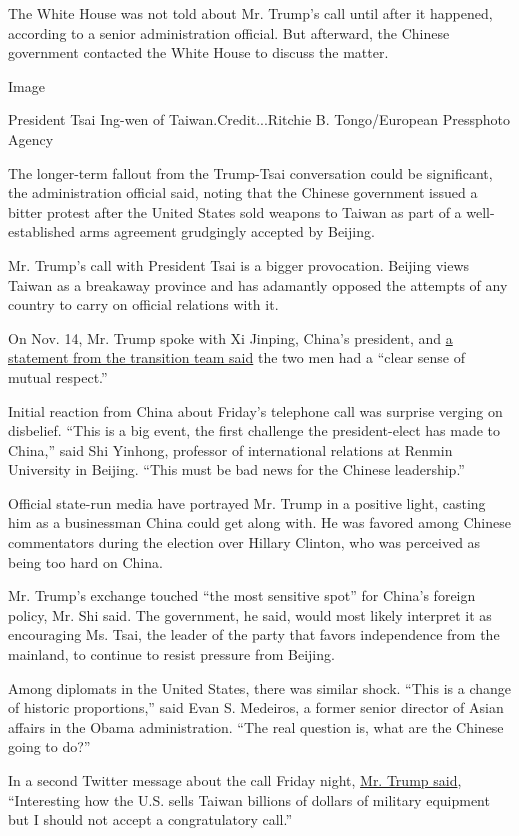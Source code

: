 The White House was not told about Mr. Trump's call until after it
happened, according to a senior administration official. But afterward,
the Chinese government contacted the White House to discuss the matter.

Image

President Tsai Ing-wen of Taiwan.Credit...Ritchie B. Tongo/European
Pressphoto Agency

The longer-term fallout from the Trump-Tsai conversation could be
significant, the administration official said, noting that the Chinese
government issued a bitter protest after the United States sold weapons
to Taiwan as part of a well-established arms agreement grudgingly
accepted by Beijing.

Mr. Trump's call with President Tsai is a bigger provocation. Beijing
views Taiwan as a breakaway province and has adamantly opposed the
attempts of any country to carry on official relations with it.

On Nov. 14, Mr. Trump spoke with Xi Jinping, China's president, and
\href{https://www.nytimes.com/2016/11/14/us/politics/donald-trump-transition.html}{a
statement from the transition team said} the two men had a ``clear sense
of mutual respect.''

Initial reaction from China about Friday's telephone call was surprise
verging on disbelief. ``This is a big event, the first challenge the
president-elect has made to China,'' said Shi Yinhong, professor of
international relations at Renmin University in Beijing. ``This must be
bad news for the Chinese leadership.''

Official state-run media have portrayed Mr. Trump in a positive light,
casting him as a businessman China could get along with. He was favored
among Chinese commentators during the election over Hillary Clinton, who
was perceived as being too hard on China.

Mr. Trump's exchange touched ``the most sensitive spot'' for China's
foreign policy, Mr. Shi said. The government, he said, would most likely
interpret it as encouraging Ms. Tsai, the leader of the party that
favors independence from the mainland, to continue to resist pressure
from Beijing.

Among diplomats in the United States, there was similar shock. ``This is
a change of historic proportions,'' said Evan S. Medeiros, a former
senior director of Asian affairs in the Obama administration. ``The real
question is, what are the Chinese going to do?''

In a second Twitter message about the call Friday night,
\href{https://twitter.com/realDonaldTrump/status/804863098138005504}{Mr.
Trump said}, ``Interesting how the U.S. sells Taiwan billions of dollars
of military equipment but I should not accept a congratulatory call.''

